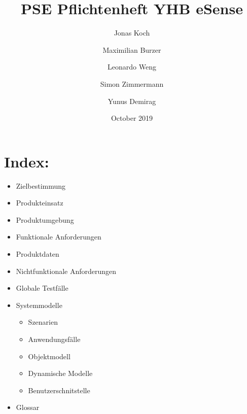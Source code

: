 


	\title{PSE Pflichtenheft YHB eSense}
	\author{Jonas Koch \and Maximilian Burzer \and Leonardo Weng \and Simon Zimmermann \and Yunus Demirag}
	\date{October 2019}
	\maketitle
	\newpage
		\section{Index:}
		\begin{itemize}
			\item Zielbestimmung
			\item Produkteinsatz
			\item Produktumgebung
			\item Funktionale Anforderungen
			\item Produktdaten
			\item Nichtfunktionale Anforderungen
			\item Globale Testfälle
			\item Systemmodelle
			\begin{itemize}
				\item Szenarien
				\item Anwendungsfälle
				\item Objektmodell
				\item Dynamische Modelle
				\item Benutzerschnitstelle
			\end{itemize}
			\item Glossar
		\end{itemize}
	\newpage
